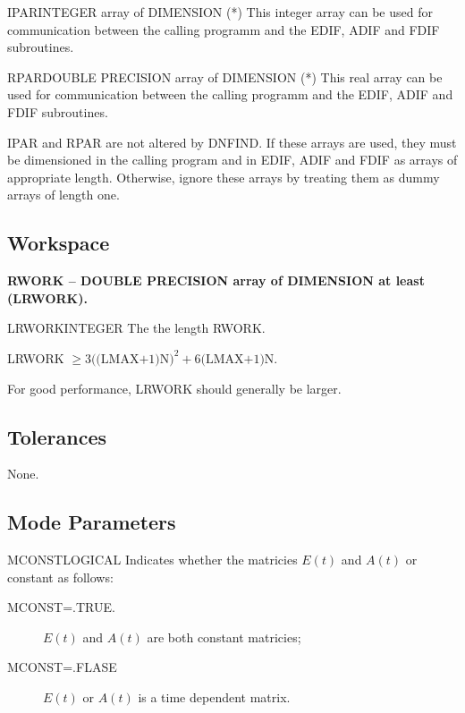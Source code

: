 \begin{entry}{IPAR}{INTEGER array of DIMENSION (*)}
  This integer array can be used for communication between the calling
  programm and the EDIF, ADIF and FDIF subroutines.
\end{entry}

\begin{entry}{RPAR}{DOUBLE PRECISION array of DIMENSION (*)}
  This real array can be used for communication between the calling
  programm and the EDIF, ADIF and FDIF subroutines.

  IPAR and RPAR are not altered by DNFIND. If these arrays are used,
  they must be dimensioned in the calling program and in EDIF, ADIF
  and FDIF as arrays of appropriate length. Otherwise, ignore these
  arrays by treating them as dummy arrays of length one.
\end{entry}

\subsection{Workspace}
\noindent
{\bf RWORK -- {DOUBLE PRECISION array of DIMENSION at least (LRWORK)}.}
\medskip

\begin{entry}{LRWORK}{INTEGER}
  The the length RWORK.

  LRWORK $\ge 3 \mbox{((LMAX+1)N)}^2 + 6 \mbox{(LMAX+1)N}$.

  For good performance, LRWORK should generally be larger.
\end{entry}

\subsection{Tolerances}
None.

\subsection{Mode Parameters}

\begin{entry}{MCONST}{LOGICAL}
  Indicates whether the matricies $E(t)$ and $A(t)$ or constant as
  follows:
  \begin{description}
  \item[MCONST=.TRUE.] $E(t)$ and $A(t)$ are both constant matricies;
  \item[MCONST=.FLASE] $E(t)$ or $A(t)$ is a time dependent matrix.
  \end{description}
\end{entry}

